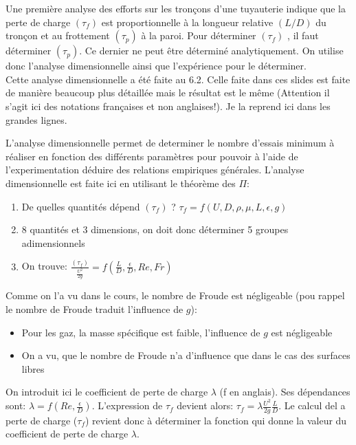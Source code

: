 Une première analyse des efforts sur les tronçons d'une tuyauterie indique que la perte de charge $(\tau_f)$ est proportionnelle à la longueur relative $(L/D)$ du tronçon et au frottement $(\tau_p)$ à la paroi. Pour déterminer  $(\tau_f)$ , il faut déterminer $(\tau_p)$. Ce dernier ne peut être déterminé analytiquement. On utilise donc l'analyse dimensionnelle ainsi que l'expérience pour le déterminer.
\\
Cette analyse dimensionnelle a été faite au 6.2. Celle faite dans ces slides est faite de manière beaucoup plus détaillée mais le résultat est le même (Attention il s'agit ici des notations françaises et non anglaises!). Je la reprend ici dans les grandes lignes. 

L'analyse dimensionnelle permet de determiner le nombre d'essais minimum à réaliser en fonction des différents paramètres pour pouvoir à l'aide de l'experimentation déduire des relations empiriques générales. L'analyse dimensionnelle est faite ici en utilisant le théorème des $\Pi$:

\begin{enumerate}
\item De quelles quantités dépend $(\tau_f)$ ?  $\tau_f=f(U,D,\rho,\mu, L, \epsilon,g)$
\item 8 quantités et 3 dimensions, on doit donc déterminer 5 groupes adimensionnels
\item On trouve: $\frac{(\tau_f)}{\frac{U^2}{2g}}=f(\frac{L}{D},\frac{\epsilon}{D},Re,Fr)$
\\
\end{enumerate}

Comme on l'a vu dans le cours, le nombre de Froude est négligeable (pou rappel le nombre de Froude traduit l'influence de  $g$):
\begin{itemize}
\item Pour les gaz, la masse spécifique est faible, l'influence de $g$ est négligeable
\item On a vu, que le nombre de Froude n'a d'influence que dans le cas des surfaces libres
\\
\end{itemize}

On introduit ici le coefficient de perte de charge $\lambda$ (f en anglais). Ses dépendances sont: $\lambda=f(Re,\frac{\epsilon}{D})$. L'expression de $\tau_f$ devient alors:  $\tau_f=\lambda \frac{U^2}{2g} \frac{L}{D}$. Le calcul del a perte de charge ($\tau_f$) revient donc à déterminer la fonction qui donne la valeur du coefficient de perte de charge $\lambda$.
\\

